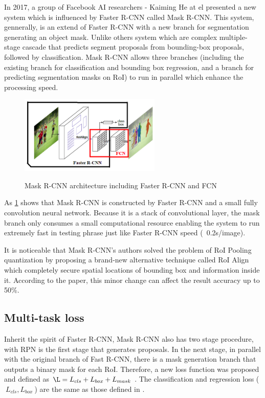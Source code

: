 	In 2017, a group of Facebook AI researchers - Kaiming He at el presented a new system which is influenced by Faster R-CNN called Mask R-CNN. This system, gennerally, is an extend of Faster R-CNN with a new branch for segmentation generating an object mask. Unlike others system which are complex multiple-stage cascade that predicts segment proposals from bounding-box proposals, followed by classification. Mask R-CNN allows three branches (including the existing branch for classification and bounding box regression, and a branch for predicting segmentation masks on RoI) to run in parallel which enhance the processing speed.	
	
	\begin{figure}[H]
		\centering
		{\includegraphics[width=0.6\textwidth]{./hinhanh/chap5/mask_rcnn.png}}
		\caption{Mask R-CNN architecture including Faster R-CNN and FCN}
		\label{fig:maskrcnn}
	\end{figure}
	
	As \ref{fig:maskrcnn} shows that Mask R-CNN is constructed by Faster R-CNN and a small fully convolution neural network. Because it is a stack of convolutional layer, the mask branch only consumes a small computational resource enabling the system to run extremely fast in testing phrase just like Faster R-CNN speed (~0.2s/image). 
	
	It is noticeable that Mask R-CNN’s authors solved the problem of RoI Pooling quantization by proposing a brand-new alternative technique called RoI Align which completely secure spatial locations of bounding box and information inside it. According to the paper, this minor change can affect the result accuracy up to 50\%.
	
\subsection{Multi-task loss}
\label{subsection:multitaskloss}
\noindent
	
	Inherit the spirit of Faster R-CNN, Mask R-CNN also has two stage procedure, with RPN is the first stage that generates proposals. In the next stage, in parallel with the original branch of Fast R-CNN, there is a mask generation branch that outputs a binary mask for each RoI. Therefore, a new loss function was proposed and defined as $ \L = L_{cls} + L_{box} + L_{mask}\ $. The classification and regression loss ($ \ L_{cls}, L_{box} \ $) are the same as those defined in \cite{fastrcnn}. 
	
